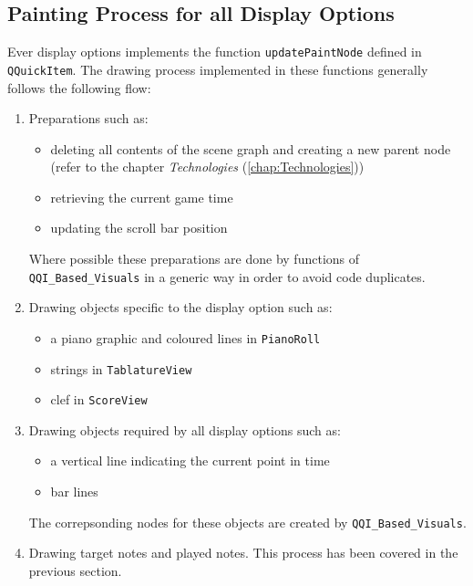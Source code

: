 \subsection{Painting Process for all Display Options}
Ever display options implements the function {\tt updatePaintNode} defined in {\tt QQuickItem}. The drawing process implemented in these functions generally follows the following flow:
\begin{enumerate}
	\item{
		Preparations such as:
		\begin{itemize}
			\item{deleting all contents of the scene graph and creating a new parent node (refer to the chapter \textit{Technologies} (\ref{chap:Technologies}))}
 			\item{retrieving the current game time}
			\item{updating the scroll bar position}
		\end{itemize}
		Where possible these preparations are done by functions of {\tt QQI\_Based\_Visuals} in a generic way in order to avoid code duplicates.
	}
	\item{
		Drawing objects specific to the display option such as:
		\begin{itemize}
			\item{a piano graphic and coloured lines in {\tt PianoRoll}}
			\item{strings in {\tt TablatureView}}
			\item{clef in {\tt ScoreView}}
		\end{itemize}
	}
	\item{
		Drawing objects required by all display options such as:
		\begin{itemize}
			\item{a vertical line indicating the current point in time}
			\item{bar lines}
		\end{itemize}
		The correpsonding nodes for these objects are created by {\tt QQI\_Based\_Visuals}.
	}
	\item{
		Drawing target notes and played notes. This process has been covered in the previous section.
	}
\end{enumerate}

